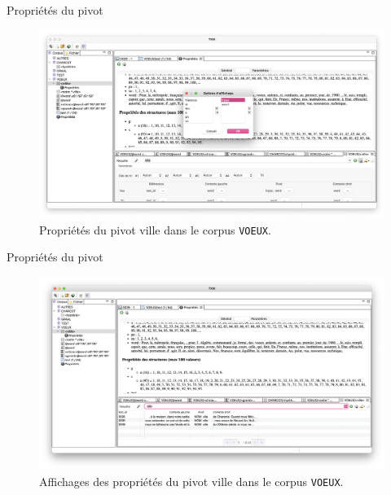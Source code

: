\documentclass[xetex,xcolor={table,usenames,dvipsnames}]{beamer}
\begin{document}
\begin{frame}{Propriétés du pivot}
	\begin{figure}[h] %
		\centering
		\includegraphics[width=1\linewidth]{img/proprietes_pivot.png}
		\caption{Propriétés du pivot \og{}ville\fg{} dans le corpus \texttt{VOEUX}.}
		\label{fig:ling_out_TAL}
	\end{figure}
\end{frame}

\begin{frame}{Propriétés du pivot}
			\begin{figure}[h] %
		\centering
		\includegraphics[width=1\linewidth]{img/affichage_proprietes_pivot.png}
		\caption{Affichages des propriétés du pivot \og{}ville\fg{} dans le corpus \texttt{VOEUX}.}
		\label{fig:ling_out_TAL}
	\end{figure}
\end{frame}
\end{document}
